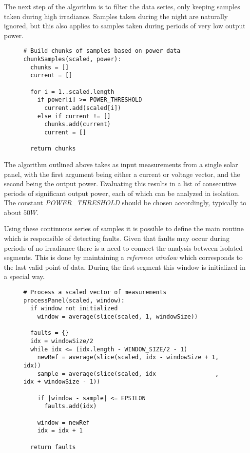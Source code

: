 The next step of the algorithm is to filter the data series, only keeping samples taken during high irradiance.
Samples taken during the night are naturally ignored, but this also applies to samples taken during periods of very low output power.

\begin{figure}[H]
\begin{verbatim}
# Build chunks of samples based on power data
chunkSamples(scaled, power):
  chunks = []
  current = []

  for i = 1..scaled.length
    if power[i] >= POWER_THRESHOLD
      current.add(scaled[i])
    else if current != []
      chunks.add(current)
      current = []

  return chunks
\end{verbatim}
\end{figure}

The algorithm outlined above takes as input measurements from a single solar panel, with the first argument being either a current or voltage vector, and the second being the output power.
Evaluating this results in a list of consecutive periods of significant output power, each of which can be analyzed in isolation.
The constant \emph{POWER\_THRESHOLD} should be chosen accordingly, typically to about $50 W$.

Using these continuous series of samples it is possible to define the main routine which is responsible of detecting faults.
Given that faults may occur during periods of no irradiance there is a need to connect the analysis between isolated segments.
This is done by maintaining a \emph{reference window} which corresponds to the last valid point of data.
During the first segment this window is initialized in a special way.

\begin{figure}[H]
\begin{verbatim}
# Process a scaled vector of measurements
processPanel(scaled, window):
  if window not initialized
    window = average(slice(scaled, 1, windowSize))

  faults = {}
  idx = windowSize/2
  while idx <= (idx.length - WINDOW_SIZE/2 - 1)
    newRef = average(slice(scaled, idx - windowSize + 1, idx))
    sample = average(slice(scaled, idx                 , idx + windowSize - 1))

    if |window - sample| <= EPSILON
      faults.add(idx)

    window = newRef
    idx = idx + 1

  return faults
\end{verbatim}
\end{figure}

